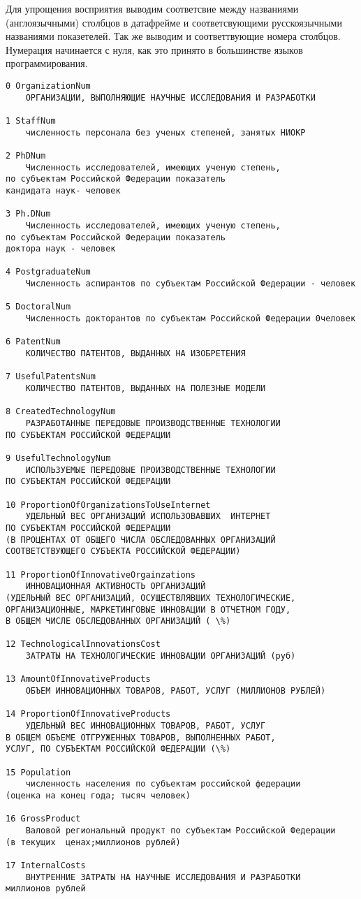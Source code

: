 \documentclass[11pt]{article}
\begin{document}
    Для упрощения восприятия выводим соответсвие между названиями
(англоязычными) столбцов в датафрейме и соответсвующими русскоязычными
названиями показетелей. Так же выводим и соответтвующие номера столбцов.
Нумерация начинается с нуля, как это принято в большинстве языков
программирования.

    \begin{Verbatim}[commandchars=\\\{\}]
0 OrganizationNum
	ОРГАНИЗАЦИИ, ВЫПОЛНЯЮЩИЕ НАУЧНЫЕ ИССЛЕДОВАНИЯ И РАЗРАБОТКИ

1 StaffNum
	численность персонала без ученых степеней, занятых НИОКР

2 PhDNum
	Численность исследователей, имеющих ученую степень,
по субъектам Российской Федерации показатель
кандидата наук- человек

3 Ph.DNum
	Численность исследователей, имеющих ученую степень,
по субъектам Российской Федерации показатель
доктора наук - человек

4 PostgraduateNum
	Численность аспирантов по субъектам Российской Федерации - человек

5 DoctoralNum
	Численность докторантов по субъектам Российской Федерации 0человек

6 PatentNum
	КОЛИЧЕСТВО ПАТЕНТОВ, ВЫДАННЫХ НА ИЗОБРЕТЕНИЯ

7 UsefulPatentsNum
	КОЛИЧЕСТВО ПАТЕНТОВ, ВЫДАННЫХ НА ПОЛЕЗНЫЕ МОДЕЛИ

8 CreatedTechnologyNum
	РАЗРАБОТАННЫЕ ПЕРЕДОВЫЕ ПРОИЗВОДСТВЕННЫЕ ТЕХНОЛОГИИ
ПО СУБЪЕКТАМ РОССИЙСКОЙ ФЕДЕРАЦИИ

9 UsefulTechnologyNum
	ИСПОЛЬЗУЕМЫЕ ПЕРЕДОВЫЕ ПРОИЗВОДСТВЕННЫЕ ТЕХНОЛОГИИ
ПО СУБЪЕКТАМ РОССИЙСКОЙ ФЕДЕРАЦИИ

10 ProportionOfOrganizationsToUseInternet
	УДЕЛЬНЫЙ ВЕС ОРГАНИЗАЦИЙ ИСПОЛЬЗОВАВШИХ  ИНТЕРНЕТ
ПО СУБЪЕКТАМ РОССИЙСКОЙ ФЕДЕРАЦИИ
(В ПРОЦЕНТАХ ОТ ОБЩЕГО ЧИСЛА ОБСЛЕДОВАННЫХ ОРГАНИЗАЦИЙ
СООТВЕТСТВУЮЩЕГО СУБЪЕКТА РОССИЙСКОЙ ФЕДЕРАЦИИ)

11 ProportionOfInnovativeOrgainzations
	ИННОВАЦИОННАЯ АКТИВНОСТЬ ОРГАНИЗАЦИЙ
(УДЕЛЬНЫЙ ВЕС ОРГАНИЗАЦИЙ, ОСУЩЕСТВЛЯВШИХ ТЕХНОЛОГИЧЕСКИЕ,
ОРГАНИЗАЦИОННЫЕ, МАРКЕТИНГОВЫЕ ИННОВАЦИИ В ОТЧЕТНОМ ГОДУ,
В ОБЩЕМ ЧИСЛЕ ОБСЛЕДОВАННЫХ ОРГАНИЗАЦИЙ ( \%)

12 TechnologicalInnovationsCost
	ЗАТРАТЫ НА ТЕХНОЛОГИЧЕСКИЕ ИННОВАЦИИ ОРГАНИЗАЦИЙ (руб)

13 AmountOfInnovativeProducts
	ОБЪЕМ ИННОВАЦИОННЫХ ТОВАРОВ, РАБОТ, УСЛУГ (МИЛЛИОНОВ РУБЛЕЙ)

14 ProportionOfInnovativeProducts
	УДЕЛЬНЫЙ ВЕС ИННОВАЦИОННЫХ ТОВАРОВ, РАБОТ, УСЛУГ
В ОБЩЕМ ОБЪЕМЕ ОТГРУЖЕННЫХ ТОВАРОВ, ВЫПОЛНЕННЫХ РАБОТ,
УСЛУГ, ПО СУБЪЕКТАМ РОССИЙСКОЙ ФЕДЕРАЦИИ (\%)

15 Population
	численность населения по субъектам российской федерации
(оценка на конец года; тысяч человек)

16 GrossProduct
	Валовой региональный продукт по субъектам Российской Федерации
(в текущих  ценах;миллионов рублей)

17 InternalCosts
	ВНУТРЕННИЕ ЗАТРАТЫ НА НАУЧНЫЕ ИССЛЕДОВАНИЯ И РАЗРАБОТКИ
миллионов рублей


    \end{Verbatim}
\end{document}
